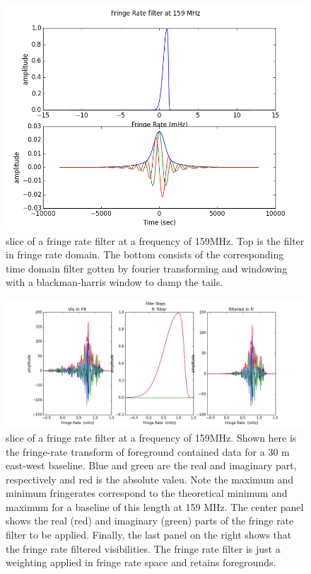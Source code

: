 \documentclass[twocolumn,numberedappendix]{emulateapj}
\begin{document}
{\begin{figure}
\centering
\includegraphics[width=\columnwidth]{plots/fr_filter_slice.png}
\caption{slice of a fringe rate filter at a frequency of 159MHz. Top is the
filter in fringe rate domain. The bottom consists of the corresponding time
domain filter gotten by fourier transforming and windowing with a
blackman-harris window to damp the tails.}
\label{fig:fringe_rate_cut}
\end{figure}

\begin{figure}[t!]\centering
\includegraphics[width=2\columnwidth]{plots/fr_preserved_signal.png}
\caption{slice of a fringe rate filter at a frequency of 159MHz. Shown here is
the fringe-rate transform of foreground contained data for a 30 m east-west
baseline. Blue and green are the real and imaginary part, respectively and red
is the absolute valeu. Note the maximum and minimum fringerates correspond to
the theoretical minimum and maximum for a baseline of this length at 159 MHz.
The center panel shows the real (red)  and imaginary (green) parts of the fringe
rate filter to be applied. Finally, the last panel on the right shows that the
fringe rate filtered visibilities. The fringe rate filter is just a weighting
applied in fringe rate space and retains foregrounds.}
\label{fig:fr_preserved_signal}
\end{figure}

}
\end{document}
